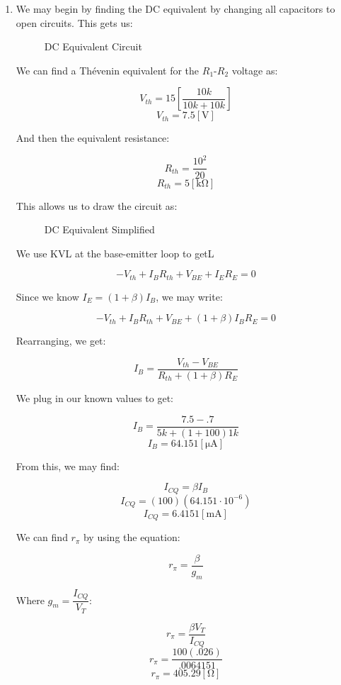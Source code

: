 \begin{enumerate}

  \item We may begin by finding the DC equivalent by changing all capacitors to open circuits. This gets us:

    \begin{figure}[H]
      \centering
      
      \caption{DC Equivalent Circuit}
      \label{fig:1}
    \end{figure}

    We can find a Th\'evenin equivalent for the $R_1$-$R_2$ voltage as:

    $$V_{th}=15\left[ \frac{10k}{10k+10k} \right]$$
    $$V_{th}=7.5[\si{\volt}]$$

    And then the equivalent resistance:

    $$R_{th}=\frac{10^2}{20}$$
    $$R_{th}=5[\si{\kilo\ohm}]$$

    This allows us to draw the circuit as:

    \begin{figure}[H]
      \centering
      
      \caption{DC Equivalent Simplified}
      \label{fig:2}
    \end{figure}

    We use KVL at the base-emitter loop to getL

    $$-V_{th}+I_BR_{th}+V_{BE}+I_{E}R_E=0$$

    Since we know $I_E=(1+\beta)I_B$, we may write:

    $$-V_{th}+I_BR_{th}+V_{BE}+(1+\beta)I_BR_E=0$$

    Rearranging, we get:

    $$I_B=\frac{V_{th}-V_{BE}}{R_{th}+(1+\beta)R_E}$$

    We plug in our known values to get:

    $$I_B=\frac{7.5-.7}{5k+(1+100)1k}$$
    $$I_B=64.151[\si{\micro\ampere}]$$

    From this, we may find:

    $$I_{CQ}=\beta I_B$$
    $$I_{CQ}=(100)(64.151\cdot10^{-6})$$
    $$\boxed{I_{CQ}=6.4151[\si{\milli\ampere}]}$$

    We can find $r_{\pi}$ by using the equation:

    $$r_{\pi}=\frac{\beta}{g_m}$$

    Where $g_m=\dfrac{I_{CQ}}{V_T}$:

    $$r_{\pi}=\frac{\beta V_T}{I_{CQ}}$$
    $$r_{\pi}=\frac{100(.026)}{.0064151}$$
    $$\boxed{r_{\pi}=405.29[\si{\ohm}]}$$


\end{enumerate}
